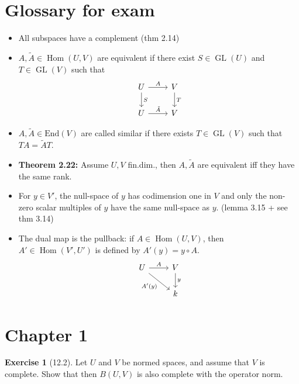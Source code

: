 \documentclass[reqno]{amsart}
\theoremstyle{definition}
\newtheorem{exercise}[theorem]{Exercise}
\theoremstyle{remark}
\DeclareMathOperator{\Hom}{Hom}
\DeclareMathOperator{\GL}{GL}
\newcommand{\End}{{\mathrm{End}}}
\begin{document}
\section{Glossary for exam}

\begin{itemize}
    \item All subspaces have a complement (thm 2.14)
    \item $A,\tilde{A}\in \Hom (U,V)$ are equivalent if there
        exist $S \in \GL (U)$ and $T \in \GL (V)$ such that
         \begin{equation*}
        \begin{tikzcd}
            U  \ar[r, "A"] \ar[d, "S"] & V \ar[d, "T"] \\
            U \ar[r, "\tilde{A}"] & V
        \end{tikzcd}
        \end{equation*}
    \item $A,\tilde{A} \in \End(V)$ are called similar if
        there exists $T \in \GL (V)$ such that
        $TA = \tilde{A}T$.
    \item \textbf{Theorem 2.22:} Assume $U,V$ fin.dim., then
        $A, \tilde{A}$ are equivalent iff they have the same rank.
    \item For $y \in V'$, the null-space of $y$ has codimension
        one in $V$ and only the non-zero scalar multiples
        of $y$ have the same null-space as $y$. (lemma 3.15 + see 
        thm 3.14)
    \item The dual map is the pullback: if $A \in \Hom (U,V)$, then
        $A' \in \Hom(V',U')$ is defined by
        $A'(y) = y \circ A$.
       \begin{equation*}
        \begin{tikzcd}
            U \ar[r, "A"] \ar[dr, "A'(y)"']& V \ar[d, "y"] \\
              & k
        \end{tikzcd}
        \end{equation*}
        
\end{itemize}


\section*{Chapter 1}

    

\begin{exercise}[12.2]
    Let $U$ and $V$ be normed spaces, and assume that $V$ is complete.
    Show that then $B(U,V)$ is also complete with the operator
    norm.
\end{exercise}
\end{document}
